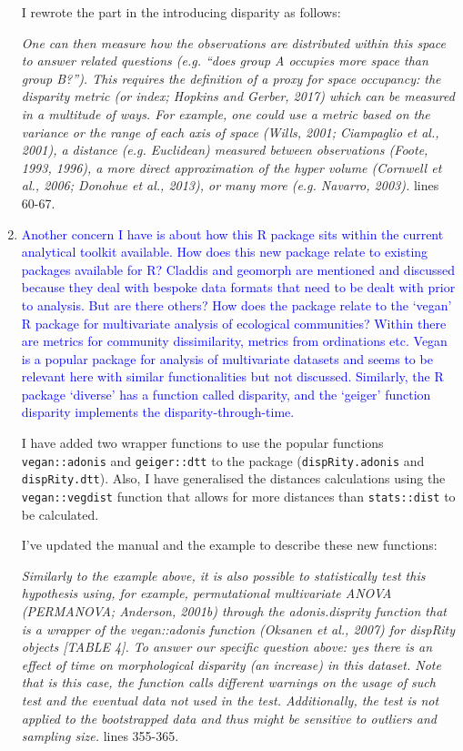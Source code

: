 \documentclass[12pt,letterpaper]{article}
\begin{document}
\begin{enumerate}
I rewrote the part in the introducing disparity as follows:

\textit{One can then measure how the observations are distributed within this space to answer related questions (e.g. ``does group A occupies more space than group B?''). This requires the definition of a proxy for space occupancy: the disparity metric (or index; Hopkins and Gerber, 2017) which can be measured in a multitude of ways. For example, one could use a metric based on the variance or the range of each axis of space (Wills, 2001; Ciampaglio et al., 2001), a distance (e.g. Euclidean) measured between observations (Foote, 1993, 1996), a more direct approximation of the hyper volume (Cornwell et al., 2006; Donohue et al., 2013), or many more (e.g. Navarro, 2003).} lines 60-67.

\item{\textcolor{blue}{Another concern I have is about how this R package sits within the current analytical toolkit available.
How does this new package relate to existing packages available for R?
Claddis and geomorph are mentioned and discussed because they deal with bespoke data formats that need to be dealt with prior to analysis.
But are there others?
How does the package relate to the ‘vegan’ R package for multivariate analysis of ecological communities?
Within there are metrics for community dissimilarity, metrics from ordinations etc.
Vegan is a popular package for analysis of multivariate datasets and seems to be relevant here with similar functionalities but not discussed.
Similarly, the R package ‘diverse’ has a function called disparity, and the ‘geiger’ function disparity implements the disparity-through-time. }}

I have added two wrapper functions to use the popular functions \texttt{vegan::adonis} and \texttt{geiger::dtt} to the package (\texttt{dispRity.adonis} and \texttt{dispRity.dtt}).
Also, I have generalised the distances calculations using the \texttt{vegan::vegdist} function that allows for more distances than \texttt{stats::dist} to be calculated.

I've updated the manual and the example to describe these new functions:

\textit{Similarly to the example above, it is also possible to statistically test this hypothesis using, for example, permutational multivariate ANOVA (PERMANOVA; Anderson, 2001b) through the adonis.disprity function that is a wrapper of the vegan::adonis function (Oksanen et al., 2007) for dispRity objects [TABLE 4]. To answer our specific question above: yes there is an effect of time on morphological disparity (an increase) in this dataset. Note that is this case, the function calls different warnings on the usage of such test and the eventual data not used in the test. Additionally, the test is not applied to the bootstrapped data and thus might be sensitive to outliers and sampling size.} lines 355-365.

\end{enumerate}
\end{document}
